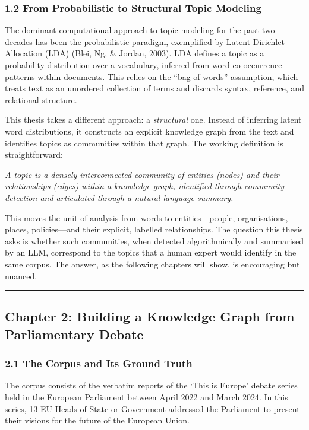 \documentclass[11pt]{article}
\begin{document}
\subsubsection{1.2 From Probabilistic to Structural Topic Modeling}


The dominant computational approach to topic modeling for the past two decades has been the probabilistic paradigm, exemplified by Latent Dirichlet Allocation (LDA) (Blei, Ng, \& Jordan, 2003). LDA defines a topic as a probability distribution over a vocabulary, inferred from word co-occurrence patterns within documents. This relies on the ``bag-of-words'' assumption, which treats text as an unordered collection of terms and discards syntax, reference, and relational structure.

This thesis takes a different approach: a \emph{structural} one. Instead of inferring latent word distributions, it constructs an explicit knowledge graph from the text and identifies topics as communities within that graph. The working definition is straightforward:

\emph{A topic is a densely interconnected community of entities (nodes) and their relationships (edges) within a knowledge graph, identified through community detection and articulated through a natural language summary.}

This moves the unit of analysis from words to entities---people, organisations, places, policies---and their explicit, labelled relationships. The question this thesis asks is whether such communities, when detected algorithmically and summarised by an LLM, correspond to the topics that a human expert would identify in the same corpus. The answer, as the following chapters will show, is encouraging but nuanced.


\hrule


\subsection{Chapter 2: Building a Knowledge Graph from Parliamentary Debate}


\subsubsection{2.1 The Corpus and Its Ground Truth}


The corpus consists of the verbatim reports of the `This is Europe' debate series held in the European Parliament between April 2022 and March 2024. In this series, 13 EU Heads of State or Government addressed the Parliament to present their visions for the future of the European Union.
\end{document}
